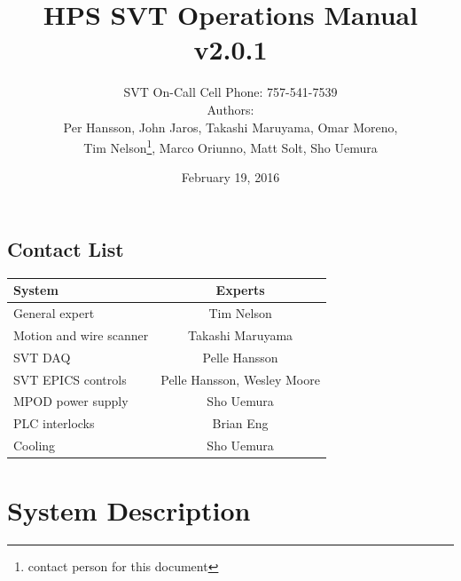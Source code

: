 \documentclass[12pt]{report}
\title{HPS SVT Operations Manual \\ v2.0.1}
\author{SVT On-Call Cell Phone: 757-541-7539 \\ 
Authors: \\
Per Hansson, John Jaros, Takashi Maruyama, Omar Moreno,\\ Tim Nelson\footnote{contact person for this document}, Marco Oriunno, Matt Solt, Sho Uemura}
\date{February 19, 2016} %
\begin{document}
\maketitle

\tableofcontents

\newpage

\section{Contact List}

\begin{center}
\begin{tabular}{lc}
\hline \hline 
System & Experts \\
\hline
General expert & Tim Nelson \\
Motion and wire scanner & Takashi Maruyama \\
SVT DAQ & Pelle Hansson \\
SVT EPICS controls & Pelle Hansson, Wesley Moore \\
MPOD power supply & Sho Uemura \\
PLC interlocks & Brian Eng \\
Cooling & Sho Uemura \\
 \hline \hline
\end{tabular}
\end{center}

\chapter{System Description}
\end{document}
